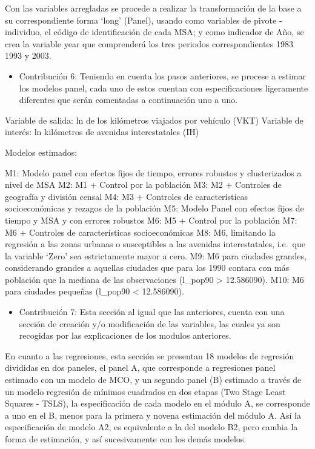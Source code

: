 \documentclass[
]{article}
\providecommand{\tightlist}{%
  \setlength{\itemsep}{0pt}\setlength{\parskip}{0pt}}
\begin{document}
Con las variables arregladas se procede a realizar la transformación de
la base a su correspondiente forma `long' (Panel), usando como variables
de pivote - individuo, el código de identificación de cada MSA; y como
indicador de Año, se crea la variable year que comprenderá los tres
periodos correspondientes 1983 1993 y 2003.

\begin{itemize}
\tightlist
\item
  Contribución 6: Teniendo en cuenta los pasos anteriores, se procese a
  estimar los modelos panel, cada uno de estos cuentan con
  especificaciones ligeramente diferentes que serán comentadas a
  continuación uno a uno.
\end{itemize}

Variable de salida: ln de los kilómetros viajados por vehículo (VKT)
Variable de interés: ln kilómetros de avenidas interestatales (IH)

Modelos estimados:

M1: Modelo panel con efectos fijos de tiempo, errores robustos y
clusterizados a nivel de MSA M2: M1 + Control por la población M3: M2 +
Controles de geografía y división censal M4: M3 + Controles de
características socioeconómicas y rezagos de la población M5: Modelo
Panel con efectos fijos de tiempo y MSA y con errores robustos M6: M5 +
Control por la población M7: M6 + Controles de características
socioeconómicas M8: M6, limitando la regresión a las zonas urbanas o
susceptibles a las avenidas interestatales, i.e.~que la variable `Zero'
sea estrictamente mayor a cero. M9: M6 para ciudades grandes,
considerando grandes a aquellas ciudades que para los 1990 contara con
más población que la mediana de las observaciones (l\_pop90
\textgreater{} 12.586090). M10: M6 para ciudades pequeñas (l\_pop90
\textless{} 12.586090).

\begin{itemize}
\tightlist
\item
  Contribución 7: Esta sección al igual que las anteriores, cuenta con
  una sección de creación y/o modificación de las variables, las cuales
  ya son recogidas por las explicaciones de los modulos anteriores.
\end{itemize}

En cuanto a las regresiones, esta sección se presentan 18 modelos de
regresión divididas en dos paneles, el panel A, que corresponde a
regresiones panel estimado con un modelo de MCO, y un segundo panel (B)
estimado a través de un modelo regresión de mínimos cuadrados en dos
etapas (Two Stage Least Squares - TSLS), la especificación de cada
modelo en el módulo A, se corresponde a uno en el B, menos para la
primera y novena estimación del módulo A. Así la especificación de
modelo A2, es equivalente a la del modelo B2, pero cambia la forma de
estimación, y así sucesivamente con los demás modelos.
\end{document}
